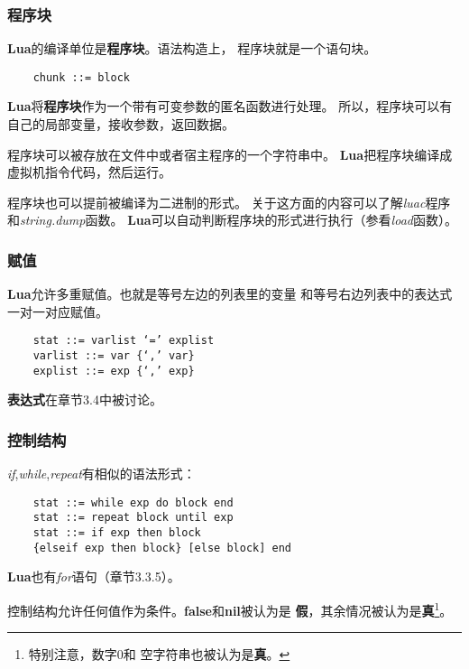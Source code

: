\documentclass{ctexart}
\begin{document}
\subsubsection{程序块}

\textbf{Lua}的编译单位是\textbf{程序块}。语法构造上，
程序块就是一个语句块。

\lstset{language=C}
\begin{lstlisting}
	chunk ::= block
\end{lstlisting}

\textbf{Lua}将\textbf{程序块}作为一个带有可变参数的匿名函数进行处理。
所以，程序块可以有自己的局部变量，接收参数，返回数据。

程序块可以被存放在文件中或者宿主程序的一个字符串中。
\textbf{Lua}把程序块编译成虚拟机指令代码，然后运行。

程序块也可以提前被编译为二进制的形式。
关于这方面的内容可以了解\emph{luac}程序和\emph{string.dump}函数。
\textbf{Lua}可以自动判断程序块的形式进行执行（参看\emph{load}函数）。

\subsubsection{赋值}

\textbf{Lua}允许多重赋值。也就是等号左边的列表里的变量
和等号右边列表中的表达式一对一对应赋值。

\lstset{language=C}
\begin{lstlisting}
	stat ::= varlist ‘=’ explist
	varlist ::= var {‘,’ var}
	explist ::= exp {‘,’ exp}
\end{lstlisting}

\textbf{表达式}在章节3.4中被讨论。

\subsubsection{控制结构}

\emph{if},\emph{while},\emph{repeat}有相似的语法形式：

\lstset{language=C}
\begin{lstlisting}
	stat ::= while exp do block end
	stat ::= repeat block until exp
	stat ::= if exp then block
	{elseif exp then block} [else block] end
\end{lstlisting}

\textbf{Lua}也有\emph{for}语句（章节3.3.5）。

控制结构允许任何值作为条件。\textbf{false}和\textbf{nil}被认为是
\textbf{假}，其余情况被认为是\textbf{真}\footnote{特别注意，数字$0$和
空字符串也被认为是\textbf{真}。}。
\end{document}
